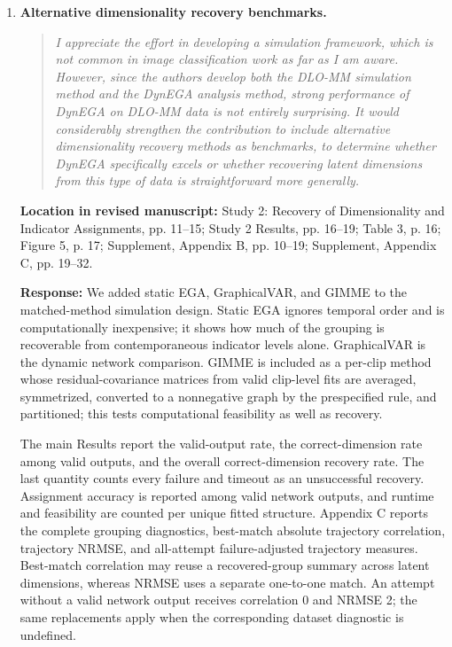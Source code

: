 \documentclass[11pt]{article}
\newenvironment{reviewquote}{\begin{quote}\small\itshape}{\end{quote}}
\newcommand{\point}[1]{\textbf{#1.}}
\newcommand{\location}[1]{\textbf{Location in revised manuscript:} #1\par}
\newcommand{\response}{\textbf{Response:} }
\begin{document}
\begin{enumerate}[resume]
  \item \point{Alternative dimensionality recovery benchmarks}
  \begin{reviewquote}
  I appreciate the effort in developing a simulation framework, which is not common in image classification work as far as I am aware. However, since the authors develop both the DLO-MM simulation method and the DynEGA analysis method, strong performance of DynEGA on DLO-MM data is not entirely surprising. It would considerably strengthen the contribution to include alternative dimensionality recovery methods as benchmarks, to determine whether DynEGA specifically excels or whether recovering latent dimensions from this type of data is straightforward more generally.
  \end{reviewquote}
  \location{Study 2: Recovery of Dimensionality and Indicator Assignments, pp. 11--15; Study 2 Results, pp. 16--19; Table 3, p. 16; Figure 5, p. 17; Supplement, Appendix B, pp. 10--19; Supplement, Appendix C, pp. 19--32.}
  \response We added static EGA, GraphicalVAR, and GIMME to the matched-method simulation design. Static EGA ignores temporal order and is computationally inexpensive; it shows how much of the grouping is recoverable from contemporaneous indicator levels alone. GraphicalVAR is the dynamic network comparison. GIMME is included as a per-clip method whose residual-covariance matrices from valid clip-level fits are averaged, symmetrized, converted to a nonnegative graph by the prespecified rule, and partitioned; this tests computational feasibility as well as recovery.

  The main Results report the valid-output rate, the correct-dimension rate among valid outputs, and the overall correct-dimension recovery rate. The last quantity counts every failure and timeout as an unsuccessful recovery. Assignment accuracy is reported among valid network outputs, and runtime and feasibility are counted per unique fitted structure. Appendix C reports the complete grouping diagnostics, best-match absolute trajectory correlation, trajectory NRMSE, and all-attempt failure-adjusted trajectory measures. Best-match correlation may reuse a recovered-group summary across latent dimensions, whereas NRMSE uses a separate one-to-one match. An attempt without a valid network output receives correlation 0 and NRMSE 2; the same replacements apply when the corresponding dataset diagnostic is undefined.


\end{enumerate}
\end{document}
